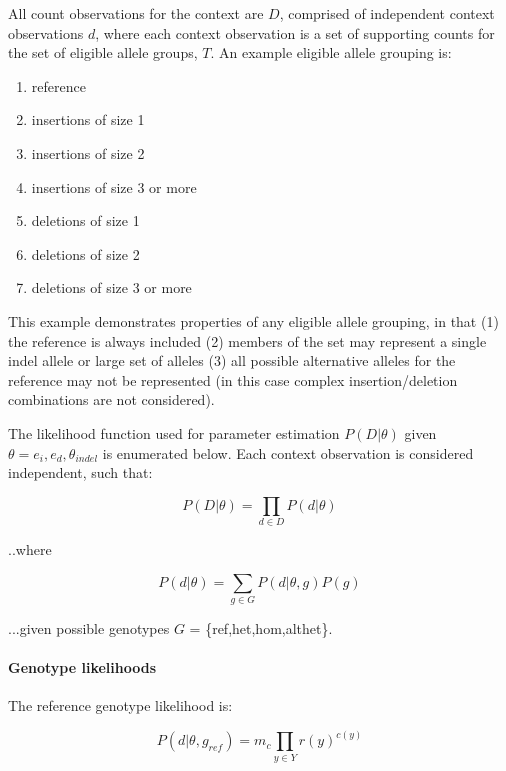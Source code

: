 \documentclass{article}
\begin{document}
All count observations for the context are $D$, comprised of independent context observations $d$, where each context observation is a set of supporting counts for the set of eligible allele groups, $T$. An example eligible allele grouping is:

\begin{enumerate}
\item reference
\item insertions of size 1
\item insertions of size 2
\item insertions of size 3 or more
\item deletions of size 1
\item deletions of size 2
\item deletions of size 3 or more
\end{enumerate}

This example demonstrates properties of any eligible allele grouping, in that (1) the reference is always included (2) members of the set may represent a single indel allele or large set of alleles (3) all possible alternative alleles for the reference may not be represented (in this case complex insertion/deletion combinations are not considered).

The likelihood function used for parameter estimation $P( D \vert \theta )$ given $\theta = {e_i,e_d,\theta_{indel}}$ is enumerated below. Each context observation is considered independent, such that:

\begin{equation}
\label{eq:indel_m2}
P(D \vert \theta) = \prod_{d \in D} P(d \vert \theta)
\end{equation}

..where

\begin{equation*}
P(d \vert \theta) = \sum_{g \in G} P(d \vert \theta, g) P(g)
\end{equation*}

...given possible genotypes $G$ = \{ref,het,hom,althet\}.

\paragraph{Genotype likelihoods}

The reference genotype likelihood is:

\begin{equation*}
P ( d \vert \theta, g_{ref}) = m_c \prod_{y \in Y} r(y)^{c(y)}
\end{equation*}
\end{document}
